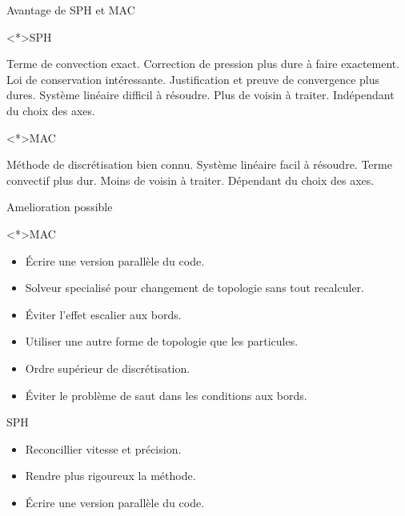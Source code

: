 \begin{frame}[<+->]{Avantage de SPH et MAC}
 
 \begin{block}<*>{SPH}
  \begin{itemize}
   \plusitem Terme de convection exact.
   \moinsitem Correction de pression plus dure à faire exactement.
   \plusitem Loi de conservation intéressante.
   \moinsitem Justification et preuve de convergence plus dures.
   \moinsitem Système linéaire difficil à résoudre.
   \moinsitem Plus de voisin à traiter.
   \plusitem Indépendant du choix des axes.
  \end{itemize}

 \end{block}

 \begin{block}<*>{MAC}
  \begin{itemize}
   \plusitem Méthode de discrétisation bien connu.
   \plusitem Système linéaire facil à résoudre.
   \moinsitem Terme convectif plus dur.
   \plusitem Moins de voisin à traiter.
   \moinsitem Dépendant du choix des axes.
  \end{itemize}

 \end{block}

 
\end{frame}

\begin{frame}[<+->]{Amelioration possible}
 
 \begin{block}<*>{MAC}
  \begin{itemize}
   \item Écrire une version parallèle du code.
   \item Solveur specialisé pour changement de topologie sans tout recalculer.
   \item Éviter l'effet escalier aux bords.
   \item Utiliser une autre forme de topologie que les particules.
   \item Ordre supérieur de discrétisation.
   \item Éviter le problème de saut dans les conditions aux bords.
  \end{itemize}
  \end{block}

\begin{block}{SPH}
\begin{itemize}
 \item Reconcillier vitesse et précision.
 \item Rendre plus rigoureux la méthode.
 \item Écrire une version parallèle du code.
 \end{itemize}
\end{block}

 
\end{frame}

